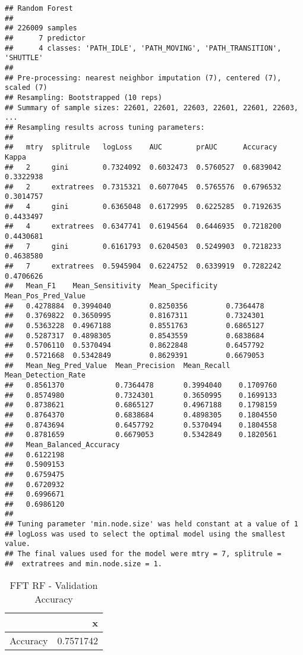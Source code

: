 \documentclass[]{article}
\begin{document}
\begin{verbatim}
## Random Forest 
## 
## 226009 samples
##      7 predictor
##      4 classes: 'PATH_IDLE', 'PATH_MOVING', 'PATH_TRANSITION', 'SHUTTLE' 
## 
## Pre-processing: nearest neighbor imputation (7), centered (7), scaled (7) 
## Resampling: Bootstrapped (10 reps) 
## Summary of sample sizes: 22601, 22601, 22603, 22601, 22601, 22603, ... 
## Resampling results across tuning parameters:
## 
##   mtry  splitrule   logLoss    AUC        prAUC      Accuracy   Kappa    
##   2     gini        0.7324092  0.6032473  0.5760527  0.6839042  0.3322938
##   2     extratrees  0.7315321  0.6077045  0.5765576  0.6796532  0.3014757
##   4     gini        0.6365048  0.6172995  0.6225285  0.7192635  0.4433497
##   4     extratrees  0.6347741  0.6194564  0.6446935  0.7218200  0.4430681
##   7     gini        0.6161793  0.6204503  0.5249903  0.7218233  0.4638580
##   7     extratrees  0.5945904  0.6224752  0.6339919  0.7282242  0.4706626
##   Mean_F1    Mean_Sensitivity  Mean_Specificity  Mean_Pos_Pred_Value
##   0.4278884  0.3994040         0.8250356         0.7364478          
##   0.3769822  0.3650995         0.8167311         0.7324301          
##   0.5363228  0.4967188         0.8551763         0.6865127          
##   0.5287317  0.4898305         0.8543559         0.6838684          
##   0.5706110  0.5370494         0.8622848         0.6457792          
##   0.5721668  0.5342849         0.8629391         0.6679053          
##   Mean_Neg_Pred_Value  Mean_Precision  Mean_Recall  Mean_Detection_Rate
##   0.8561370            0.7364478       0.3994040    0.1709760          
##   0.8574980            0.7324301       0.3650995    0.1699133          
##   0.8738621            0.6865127       0.4967188    0.1798159          
##   0.8764370            0.6838684       0.4898305    0.1804550          
##   0.8743694            0.6457792       0.5370494    0.1804558          
##   0.8781659            0.6679053       0.5342849    0.1820561          
##   Mean_Balanced_Accuracy
##   0.6122198             
##   0.5909153             
##   0.6759475             
##   0.6720932             
##   0.6996671             
##   0.6986120             
## 
## Tuning parameter 'min.node.size' was held constant at a value of 1
## logLoss was used to select the optimal model using the smallest value.
## The final values used for the model were mtry = 7, splitrule =
##  extratrees and min.node.size = 1.
\end{verbatim}

\begin{table}[!h]

\caption{\label{tab:fft-rf-results}FFT RF - Validation Accuracy}
\centering
\begin{tabular}[t]{lr}
\toprule
  & x\\
\midrule
Accuracy & 0.7571742\\
\bottomrule
\end{tabular}
\end{table}
\end{document}
